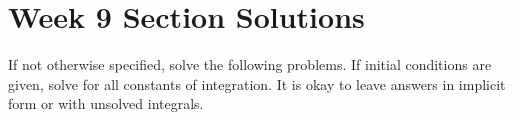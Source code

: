 \documentclass[letterpaper, fontsize=11pt]{scrartcl} %
\numberwithin{equation}{section} %
\numberwithin{figure}{section} %
\numberwithin{table}{section} %
\begin{document}

\newcommand{\horrule}[1]{\rule{\linewidth}{#1}} %


\section*{Week 9 Section Solutions}
\par If not otherwise specified, solve the following problems. If initial conditions are given, solve for all constants of integration. It is okay to leave answers in implicit form or with unsolved integrals. 
\end{document}
